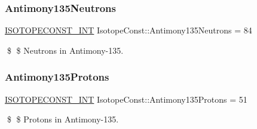 \subsubsection{\texorpdfstring{Antimony135\+Neutrons}{Antimony135Neutrons}}
{\footnotesize\ttfamily \mbox{\hyperlink{group___isotope_const-_macros_ga5f18360b3e99483a35c32d789e62621c}{I\+S\+O\+T\+O\+P\+E\+C\+O\+N\+S\+T\+\_\+\+I\+NT}} Isotope\+Const\+::\+Antimony135\+Neutrons = 84}

\$ \$ Neutrons in Antimony-\/135. \mbox{\label{group___isotope_const-_antimony-_sb135_ga74078ec106dd519274c69bb066eca195}} 
\subsubsection{\texorpdfstring{Antimony135\+Protons}{Antimony135Protons}}
{\footnotesize\ttfamily \mbox{\hyperlink{group___isotope_const-_macros_ga5f18360b3e99483a35c32d789e62621c}{I\+S\+O\+T\+O\+P\+E\+C\+O\+N\+S\+T\+\_\+\+I\+NT}} Isotope\+Const\+::\+Antimony135\+Protons = 51}

\$ \$ Protons in Antimony-\/135. 
